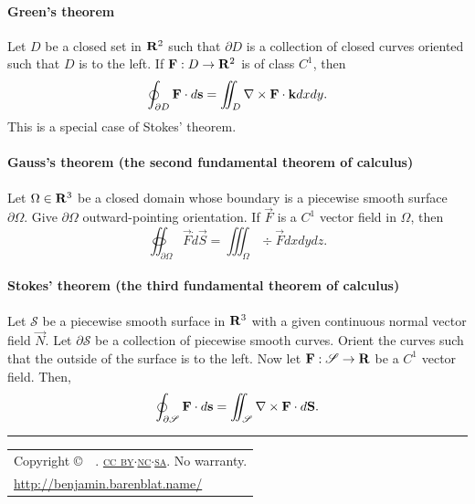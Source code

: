 \documentclass[10pt,landscape]{article}
\makeatletter
\newcommand{\makeend}{%
  \vfill
  \rule{0.3\linewidth}{0.25pt}
  \scriptsize
  \begin{tabular}{@{}l}
    Copyright \copyright\ \@date\ \@author.  \href{http://creativecommons.org/licenses/by-nc-sa/3.0/us/}{\textsc{cc by$\cdot$nc$\cdot$sa}}.  No warranty.\\
    \url{http://benjamin.barenblat.name/}
  \end{tabular}
}
\makeatother
\begin{document}
\begin{multicols*}{3}
\paragraph{Green's theorem}
Let $D$ be a closed set in $\mathbf{R}^2$ such that $\partial D$ is a collection of closed curves oriented such that $D$ is to the left.
If $\mathbf{F}: D \to \mathbf{R}^2$ is of class $C^1$, then
\begin{equation}
  \oint_{\partial D} \mathbf{F} \cdot d\mathbf{s} = \iint_D \nabla\times \mathbf{F} \cdot \mathbf{k} dxdy.
\end{equation}
This is a special case of Stokes' theorem.

\paragraph{Gauss's theorem (the second fundamental theorem of calculus)}
Let $\Omega \in \mathbf{R}^3$ be a closed domain whose boundary is a piecewise smooth surface $\partial\Omega$.
Give $\partial\Omega$ outward-pointing orientation.
If $\vec F$ is a $C^1$ vector field in $\Omega$, then
\begin{equation}
  \oiint_{\partial\Omega} \vec F \dot d\vec S = \iiint_\Omega \div\vec F dxdydz.
\end{equation}

\paragraph{Stokes' theorem (the third fundamental theorem of calculus)}
Let $\mathscr{S}$ be a piecewise smooth surface in $\mathbf{R}^3$ with a given continuous normal vector field $\vec N$.
Let $\partial\mathscr{S}$ be a collection of piecewise smooth curves.
Orient the curves such that the outside of the surface is to the left.
Now let $\mathbf{F} : \mathscr{S} \to \mathbf{R}$ be a $C^1$ vector field.
Then,
\begin{equation}
  \oint_{\partial\mathscr{S}} \mathbf{F} \cdot d\mathbf{s} = \iint_\mathscr{S} \nabla\times \mathbf{F} \cdot d\mathbf{S}.
\end{equation}

\makeend
\end{multicols*}
\end{document}
